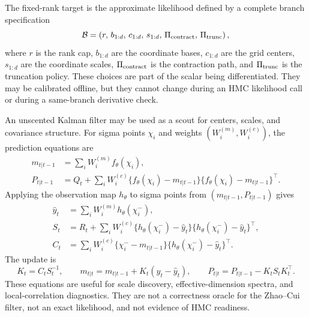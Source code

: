 \documentclass[11pt]{article}
\numberwithin{equation}{section}
\begin{document}
The fixed-rank target is the approximate likelihood defined by a complete
branch specification
\begin{equation}
    \mathcal B
    =
    \left(
    r,\,
    b_{1:d},\,
    c_{1:d},\,
    s_{1:d},\,
    \Pi_{\rm contract},\,
    \Pi_{\rm trunc}
    \right),
    \label{eq:p52-fixed-rank-branch}
\end{equation}
where \(r\) is the rank cap, \(b_{1:d}\) are the coordinate bases, \(c_{1:d}\)
are the grid centers, \(s_{1:d}\) are the coordinate scales,
\(\Pi_{\rm contract}\) is the contraction path, and \(\Pi_{\rm trunc}\) is the
truncation policy.  These choices are part of the scalar being differentiated.
They may be calibrated offline, but they cannot change during an HMC
likelihood call or during a same-branch derivative check.

An unscented Kalman filter may be used as a scout for centers, scales, and
covariance structure.  For sigma points \(\chi_i\) and weights
\((W_i^{(m)},W_i^{(c)})\), the prediction equations are
\begin{align}
    m_{t|t-1}
    &=
    \sum_i W_i^{(m)} f_\theta(\chi_i),
    \label{eq:p52-ukf-pred-mean}\\
    P_{t|t-1}
    &=
    Q_t+
    \sum_i W_i^{(c)}
    \{f_\theta(\chi_i)-m_{t|t-1}\}
    \{f_\theta(\chi_i)-m_{t|t-1}\}^{\top}.
    \label{eq:p52-ukf-pred-cov}
\end{align}
Applying the observation map \(h_\theta\) to sigma points from
\((m_{t|t-1},P_{t|t-1})\) gives
\begin{align}
    \widehat y_t
    &=
    \sum_i W_i^{(m)}h_\theta(\chi_i^-),
    \label{eq:p52-ukf-obs-mean}\\
    S_t
    &=
    R_t+
    \sum_i W_i^{(c)}
    \{h_\theta(\chi_i^-)-\widehat y_t\}
    \{h_\theta(\chi_i^-)-\widehat y_t\}^{\top},
    \label{eq:p52-ukf-obs-cov}\\
    C_t
    &=
    \sum_i W_i^{(c)}
    \{\chi_i^- -m_{t|t-1}\}
    \{h_\theta(\chi_i^-)-\widehat y_t\}^{\top}.
    \label{eq:p52-ukf-cross-cov}
\end{align}
The update is
\begin{equation}
    K_t=C_tS_t^{-1},
    \qquad
    m_{t|t}=m_{t|t-1}+K_t(y_t-\widehat y_t),
    \qquad
    P_{t|t}=P_{t|t-1}-K_tS_tK_t^\top.
    \label{eq:p52-ukf-update}
\end{equation}
These equations are useful for scale discovery, effective-dimension spectra,
and local-correlation diagnostics.  They are not a correctness oracle for the
Zhao--Cui filter, not an exact likelihood, and not evidence of HMC readiness.
\end{document}
